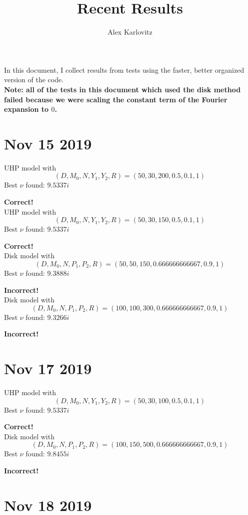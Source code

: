 \documentclass[]{article}
\title{Recent Results}
\author{Alex Karlovitz}
\date{}
\begin{document}
	
	\maketitle
	
	In this document, I collect results from tests using the faster, better organized version of the code.
	\\
	
	\textbf{Note: all of the tests in this document which used the disk method failed because we were scaling the constant term of the Fourier expansion to $0$.}
	
	\section*{Nov 15 2019}
	
	UHP model with
	$$
	(D, M_0, N, Y_1, Y_2, R) =
	(50, 30, 200, 0.5, 0.1, 1)
	$$
	Best $\nu$ found: $9.5337i$
	
	\textbf{Correct!}
	\\
	
	UHP model with
	$$
	(D, M_0, N, Y_1, Y_2, R) =
	(50, 30, 150, 0.5, 0.1, 1)
	$$
	Best $\nu$ found: $9.5337i$
	
	\textbf{Correct!}
	\\
	
	Disk model with
	$$
	(D, M_0, N, P_1, P_2, R) =
	(50, 50, 150, 0.666666666667, 0.9, 1)
	$$
	Best $\nu$ found: $9.3888i$
	
	\textbf{Incorrect!}
	\\
	
	Disk model with
	$$
	(D, M_0, N, P_1, P_2, R) =
	(100, 100, 300, 0.666666666667, 0.9, 1)
	$$
	Best $\nu$ found: $9.3266i$
	
	\textbf{Incorrect!}
	
	\section*{Nov 17 2019}
	
	UHP model with
	$$
	(D, M_0, N, Y_1, Y_2, R) =
	( 50,30,100,0.5,0.1,1 )
	$$
	Best $\nu$ found: $9.5337i$
	
	\textbf{Correct!}
	\\
	
	Disk model with
	$$
	(D, M_0, N, P_1, P_2, R) =
	( 100,150,500,0.666666666667,0.9,1 )
	$$
	Best $\nu$ found: $9.8455i$
	
	\textbf{Incorrect!}
	
	\section*{Nov 18 2019}
	
\end{document}
